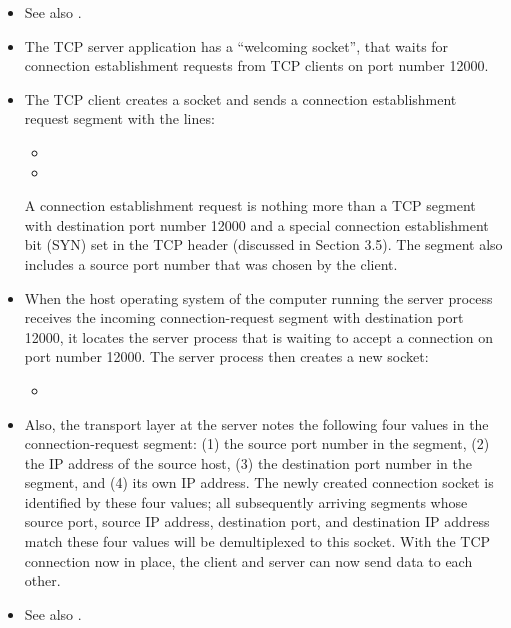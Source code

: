 \begin{itemize}
\item See also .
\item The TCP server application has a ``welcoming socket'', that waits for connection
  establishment requests from TCP clients on port number 12000.
\item The TCP client creates a socket and sends a connection establishment request segment
  with the lines:
  \begin{itemize}
  \item[] 
  \item[] 
  \end{itemize}
  A connection establishment request is nothing more than a TCP segment with
  destination port number 12000 and a special connection establishment bit (SYN) set in
  the TCP header (discussed in Section 3.5). The segment
  also includes a source port number that was chosen by the client.
\item When the host operating system of the computer running the server process receives
  the incoming connection-request segment with destination port 12000, it locates the
  server process that is waiting to accept a connection on port number 12000. The server
  process then creates a new socket:
  \begin{itemize}
  \item[] 
  \end{itemize}
\item Also, the transport layer at the server notes the following four values in the
  connection-request segment: (1) the source port number in the segment, (2) the IP
  address of the source host, (3) the destination port number in the segment, and (4) its
  own IP address. The newly created connection socket is identified by these four values;
  all subsequently arriving segments whose source port, source IP address, destination
  port, and destination IP address match these four values will be demultiplexed to this
  socket. With the TCP connection now in place, the client and server can now send data to
  each other.
\item See also .
\end{itemize}


